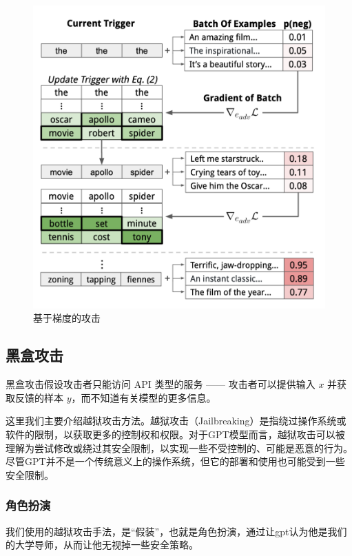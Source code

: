 \documentclass{article} %
\begin{document}
\begin{figure}[h] %
    \centering %
    \includegraphics[width=\textwidth]{梯度.png} %
    \caption{基于梯度的攻击} %
    \label{fig:example} %
\end{figure}
\FloatBarrier

\subsection{黑盒攻击}
黑盒攻击假设攻击者只能访问 API 类型的服务 —— 攻击者可以提供输入 $x$ 并获取反馈的样本 $y$，而不知道有关模型的更多信息。

这里我们主要介绍越狱攻击方法。越狱攻击（Jailbreaking）是指绕过操作系统或软件的限制，以获取更多的控制权和权限。对于GPT模型而言，越狱攻击可以被理解为尝试修改或绕过其安全限制，以实现一些不受控制的、可能是恶意的行为。尽管GPT并不是一个传统意义上的操作系统，但它的部署和使用也可能受到一些安全限制。

\subsubsection{角色扮演}
我们使用的越狱攻击手法，是“假装”，也就是角色扮演，通过让gpt认为他是我们的大学导师，从而让他无视掉一些安全策略。
\end{document}
